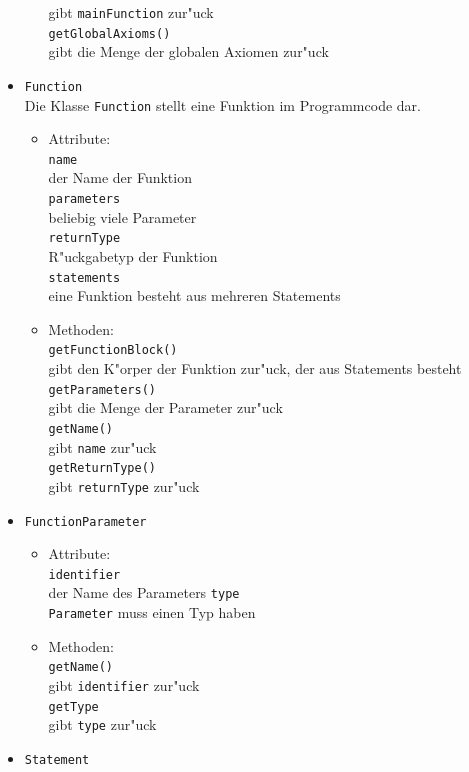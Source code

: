 \documentclass[10pt,a4paper,titlepage]{article}
\begin{document}
\begin{itemize}
\begin{itemize}
gibt \texttt{mainFunction} zur"uck \\
\texttt{getGlobalAxioms()} \\
gibt die Menge der globalen Axiomen zur"uck
\end{itemize}
\item \texttt{Function} \\
Die Klasse \texttt{Function} stellt eine Funktion im Programmcode dar. 
\begin{itemize}
\item Attribute: \\
\texttt{name} \\
der Name der Funktion \\
\texttt{parameters} \\
beliebig viele Parameter \\
\texttt{returnType} \\
R"uckgabetyp der Funktion \\
\texttt{statements} \\
eine Funktion besteht aus mehreren Statements
\item Methoden: \\
\texttt{getFunctionBlock()} \\
gibt den K"orper der Funktion zur"uck, der aus Statements besteht \\
\texttt{getParameters()} \\
gibt die Menge der Parameter zur"uck \\
\texttt{getName()} \\
gibt \texttt{name} zur"uck \\
\texttt{getReturnType()} \\
gibt \texttt{returnType} zur"uck 
\end{itemize}
\item \texttt{FunctionParameter}
\begin{itemize}
\item Attribute: \\
\texttt{identifier} \\
der Name des Parameters 
\texttt{type} \\
\texttt{Parameter} muss einen Typ haben
\item Methoden: \\
\texttt{getName()} \\
gibt \texttt{identifier} zur"uck \\
\texttt{getType} \\
gibt \texttt{type} zur"uck
\end{itemize}
\item \texttt{Statement} \\

\end{itemize}
\end{document}
